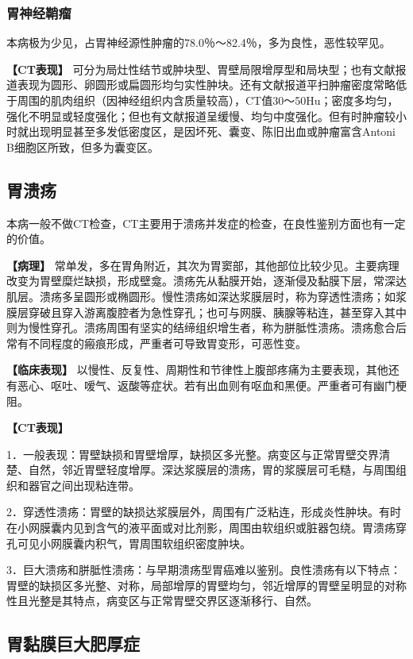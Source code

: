 \subsubsection{胃神经鞘瘤}

本病极为少见，占胃神经源性肿瘤的78.0％～82.4％，多为良性，恶性较罕见。

\textbf{【CT表现】}
可分为局灶性结节或肿块型、胃壁局限增厚型和局块型；也有文献报道表现为圆形、卵圆形或扁圆形均匀实性肿块。还有文献报道平扫肿瘤密度常略低于周围的肌肉组织（因神经组织内含质量较高），CT值30～50Hu；密度多均匀，强化不明显或轻度强化；但也有文献报道呈缓慢、均匀中度强化。但有时肿瘤较小时就出现明显甚至多发低密度区，是因坏死、囊变、陈旧出血或肿瘤富含Antoni
B细胞区所致，但多为囊变区。

\subsection{胃溃疡}

本病一般不做CT检查，CT主要用于溃疡并发症的检查，在良性鉴别方面也有一定的价值。

\textbf{【病理】}
常单发，多在胃角附近，其次为胃窦部，其他部位比较少见。主要病理改变为胃壁糜烂缺损，形成壁龛。溃疡先从黏膜开始，逐渐侵及黏膜下层，常深达肌层。溃疡多呈圆形或椭圆形。慢性溃疡如深达浆膜层时，称为穿透性溃疡；如浆膜层穿破且穿入游离腹腔者为急性穿孔；也可与网膜、胰腺等粘连，甚至穿入其中则为慢性穿孔。溃疡周围有坚实的结缔组织增生者，称为胼胝性溃疡。溃疡愈合后常有不同程度的瘢痕形成，严重者可导致胃变形，可恶性变。

\textbf{【临床表现】}
以慢性、反复性、周期性和节律性上腹部疼痛为主要表现，其他还有恶心、呕吐、嗳气、返酸等症状。若有出血则有呕血和黑便。严重者可有幽门梗阻。

\textbf{【CT表现】}

1．一般表现：胃壁缺损和胃壁增厚，缺损区多光整。病变区与正常胃壁交界清楚、自然，邻近胃壁轻度增厚。深达浆膜层的溃疡，胃的浆膜层可毛糙，与周围组织和器官之间出现粘连带。

2．穿透性溃疡：胃壁的缺损达浆膜层外，周围有广泛粘连，形成炎性肿块。有时在小网膜囊内见到含气的液平面或对比剂影，周围由软组织或脏器包绕。胃溃疡穿孔可见小网膜囊内积气，胃周围软组织密度肿块。

3．巨大溃疡和胼胝性溃疡：与早期溃疡型胃癌难以鉴别。良性溃疡有以下特点：胃壁的缺损区多光整、对称，局部增厚的胃壁均匀，邻近增厚的胃壁呈明显的对称性且光整是其特点，病变区与正常胃壁交界区逐渐移行、自然。

\subsection{胃黏膜巨大肥厚症}

